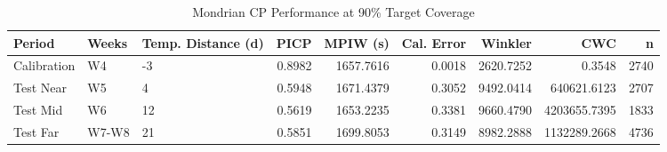 \begin{table}
\caption{Mondrian CP Performance at 90\% Target Coverage}
\label{tab:t4b_1_mondrian_cp_90}
\begin{tabular}{lllrrrrrr}
\toprule
Period & Weeks & Temp. Distance (d) & PICP & MPIW (s) & Cal. Error & Winkler & CWC & n \\
\midrule
Calibration & W4 & -3 & 0.8982 & 1657.7616 & 0.0018 & 2620.7252 & 0.3548 & 2740 \\
Test Near & W5 & 4 & 0.5948 & 1671.4379 & 0.3052 & 9492.0414 & 640621.6123 & 2707 \\
Test Mid & W6 & 12 & 0.5619 & 1653.2235 & 0.3381 & 9660.4790 & 4203655.7395 & 1833 \\
Test Far & W7-W8 & 21 & 0.5851 & 1699.8053 & 0.3149 & 8982.2888 & 1132289.2668 & 4736 \\
\bottomrule
\end{tabular}
\end{table}
